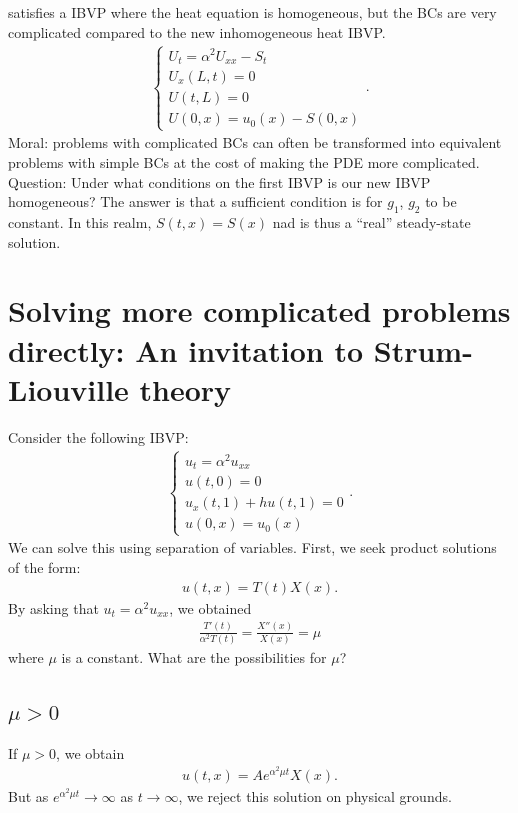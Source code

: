 \documentclass{book}
\theoremstyle{definition}
\begin{document}
satisfies a IBVP where the heat equation is homogeneous, but the BCs are very complicated compared to the new inhomogeneous heat IBVP. 
\begin{align*}
\begin{cases}
U_t = \alpha^2 U_{xx} - S_t\\
U_x(L,t) = 0\\
U(t,L) = 0\\
U(0,x) = u_0(x) - S(0,x)
\end{cases}.
\end{align*}
Moral: problems with complicated BCs can often be transformed into equivalent problems with simple BCs at the cost of making the PDE more complicated. \\

Question: Under what conditions on the first IBVP is our new IBVP homogeneous? The answer is that a sufficient condition is for $g_1$, $g_2$ to be constant. In this realm, $S(t,x) = S(x)$ nad is thus a ``real'' steady-state solution.

\newpage

\chapter{Solving more complicated problems directly: An invitation to Strum-Liouville theory}

Consider the following IBVP:
\begin{align*}
\begin{cases}
u_t = \alpha^2 u_{xx}\\
u(t,0) = 0\\
u_x(t,1) + hu(t,1) = 0\\
u(0,x) = u_0(x) 
\end{cases}.
\end{align*}
We can solve this using separation of variables. First, we seek product solutions of the form:
\begin{align*}
u(t,x) = T(t)X(x).
\end{align*}
By asking that $u_t = \alpha^2 u_{xx}$, we obtained 
\begin{align*}
\frac{T'(t)}{\alpha^2 T(t)} = \frac{X''(x)}{X(x)} = \mu
\end{align*}
where $\mu$ is a constant. What are the possibilities for $\mu$?\\

\section{$\mu > 0$}
If $\mu>0$, we obtain
\begin{align*}
u(t,x) = Ae^{\alpha^2 \mu t}X(x).
\end{align*}
But as $e^{\alpha^2 \mu t} \to \infty$ as $t\to\infty$, we reject this solution on physical grounds. \\
\end{document}
